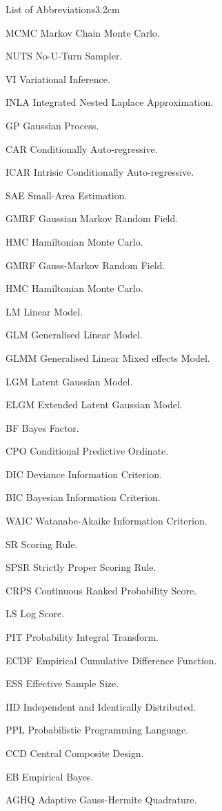 \begin{mclistof}{List of Abbreviations}{3.2cm}
\item[MCMC] Markov Chain Monte Carlo.
\item[NUTS] No-U-Turn Sampler.
\item[VI] Variational Inference.
\item[INLA] Integrated Nested Laplace Approximation.
\item[GP] Gaussian Process.
\item[CAR] Conditionally Auto-regressive.
\item[ICAR] Intrisic Conditionally Auto-regressive.
\item[SAE] Small-Area Estimation.
\item[GMRF] Gaussian Markov Random Field.
\item[HMC] Hamiltonian Monte Carlo.
\item[GMRF] Gauss-Markov Random Field.
\item[HMC] Hamiltonian Monte Carlo.
\item[LM] Linear Model.
\item[GLM] Generalised Linear Model.
\item[GLMM] Generalised Linear Mixed effects Model.
\item[LGM] Latent Gaussian Model.
\item[ELGM] Extended Latent Gaussian Model.
\item[BF] Bayes Factor.
\item[CPO] Conditional Predictive Ordinate.
\item[DIC] Deviance Information Criterion.
\item[BIC] Bayesian Information Criterion.
\item[WAIC] Watanabe-Akaike Information Criterion.
\item[SR] Scoring Rule.
\item[SPSR] Strictly Proper Scoring Rule.
\item[CRPS] Continuous Ranked Probability Score.
\item[LS] Log Score.
\item[PIT] Probability Integral Transform.
\item[ECDF] Empirical Cumulative Difference Function.
\item[ESS] Effective Sample Size.
\item[IID] Independent and Identically Distributed.
\item[PPL] Probabilistic Programming Language.
\item[CCD] Central Composite Design.
\item[EB] Empirical Bayes.
\item[AGHQ] Adaptive Gauss-Hermite Quadrature.

\end{mclistof} 
